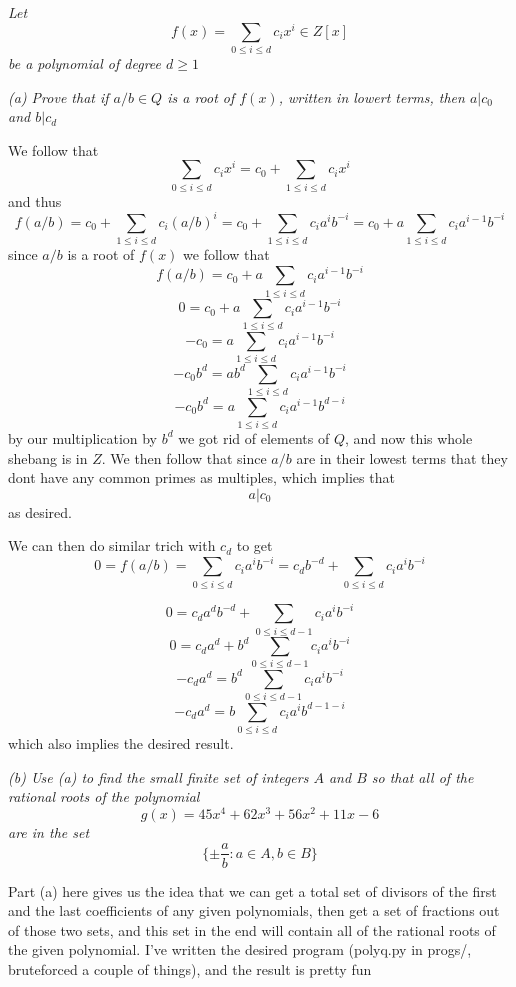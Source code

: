\documentclass[11pt,oneside,titlepage]{book}
\newcommand{\set}[1]{\{ #1 \}}
\begin{document}
\textit{Let
  $$f(x) = \sum_{0 \leq i \leq d}{c_i x^i} \in Z[x]$$
  be a polynomial of degree $d \geq 1$}

\textit{(a) Prove that if $a/b \in Q$ is a root of $f(x)$, written in lowert terms,
  then $a | c_0$ and $b | c_d$}

We follow that
$$\sum_{0 \leq i \leq d}{c_i x^i}  = c_0 + \sum_{1 \leq i \leq d}{c_i x^i} $$
and thus
$$f(a/b) = c_0 + \sum_{1 \leq i \leq d}{c_i (a/b)^i} =
c_0 + \sum_{1 \leq i \leq d}{c_i a^i b^{-i}} =
c_0 + a \sum_{1 \leq i \leq d}{c_i a^{i - 1} b^{-i}}$$
since $a/b$ is a root of $f(x)$ we follow that
$$f(a/b) = c_0 + a \sum_{1 \leq i \leq d}{c_i a^{i - 1} b^{-i}}$$
$$0 = c_0 + a \sum_{1 \leq i \leq d}{c_i a^{i - 1} b^{-i}}$$
$$-c_0 = a \sum_{1 \leq i \leq d}{c_i a^{i - 1} b^{-i}}$$
$$-c_0 b^d = a b^d \sum_{1 \leq i \leq d}{c_i a^{i - 1} b^{-i}}$$
$$-c_0 b^d = a \sum_{1 \leq i \leq d}{c_i a^{i - 1} b^{d - i}}$$
by our multiplication by $b^d$ we got rid of elements of $Q$, and now
this whole shebang is in $Z$.  We then follow that since $a/b$ are in
their lowest terms that they dont have any common primes as multiples,
which implies that
$$a | c_0$$
as desired.

We can then do similar trich with $c_d$ to get 
$$0 = f(a / b) = \sum_{0 \leq i \leq d}{c_i a^i b^{-i}} =
c_d b^{-d} +  \sum_{0 \leq i \leq d}{c_i a^i b^{-i}}$$

$$0 = c_d a^d b^{-d} +  \sum_{0 \leq i \leq d - 1}{c_i a^i b^{-i}}$$
$$0 = c_da^d  +  b^d \sum_{0 \leq i \leq d - 1}{c_i a^i b^{-i}}$$
$$-c_da^d =  b^d \sum_{0 \leq i \leq d - 1}{c_i a^i b^{-i}}$$
$$-c_da^d =  b \sum_{0 \leq i \leq d}{c_i a^i b^{d - 1 - i}}$$
which also implies the desired result.

\textit{(b) Use (a) to find the small finite set of integers $A$ and $B$ so that
  all of the rational roots of the polynomial
  $$g(x) = 45x^4 + 62x^3 + 56x^2 + 11x - 6$$
  are in the set
  $$\set{\pm \frac a b : a \in A, b \in B}$$}

Part (a) here gives us the idea that we can get a total set of
divisors of the first and the last coefficients of any given
polynomials, then get a set of fractions out of those two sets, and
this set in the end will contain all of the rational roots of the
given polynomial. I've written the desired program (polyq.py in
progs/, bruteforced a couple of things), and the result is pretty fun

\subsection{}
\end{document}
